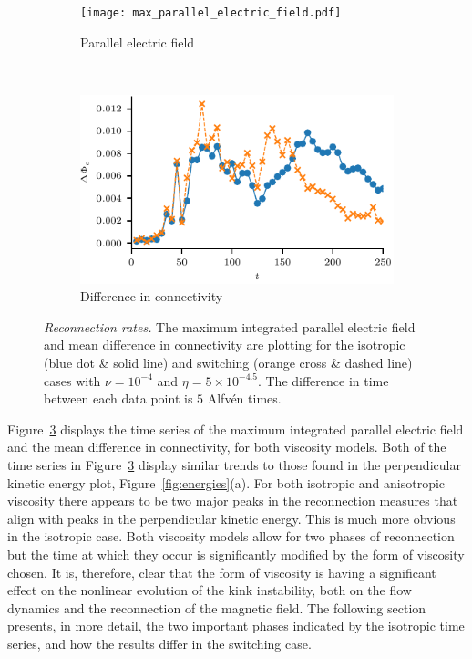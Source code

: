 \begin{figure}[t]
    \centering
    \begin{subfigure}[t]{0.5\textwidth}
      \centering
      \texttt{[image: max\_parallel\_electric\_field.pdf]}
      \caption{Parallel electric field}
      \label{fig:max_parallel_electric_field}
    \end{subfigure}%
    ~
    \begin{subfigure}[t]{0.5\textwidth}
      \centering
      \includegraphics[width=\linewidth]{mean_difference_in_connectivity.pdf}
      \caption{Difference in connectivity}
      \label{fig:mean_difference_in_connectivity}
    \end{subfigure}
    \caption{\textit{Reconnection rates.} The maximum integrated parallel electric field and mean difference in connectivity are plotting for the isotropic (blue dot \& solid line) and switching (orange cross \& dashed line) cases with $\nu = 10^{-4}$ and $\eta = 5\times 10^{-4.5}$. The difference in time between each data point is $5$ Alfv\'en times.}
    \label{fig:reconnection-rates}
\end{figure}

Figure~\ref{fig:reconnection-rates} displays the time series of the maximum integrated parallel electric field and the mean difference in connectivity, for both viscosity models. Both of the time series in Figure~\ref{fig:reconnection-rates} display similar trends to those found in the perpendicular kinetic energy plot, Figure~\ref{fig:energies}(a). For both isotropic and anisotropic viscosity there appears to be two major peaks in the reconnection measures that align with peaks in the perpendicular kinetic energy. This is much more obvious in the isotropic case. Both viscosity models allow for two phases of reconnection but the time at which they occur is significantly modified by the form of viscosity chosen. It is, therefore, clear that the form of viscosity is having a significant effect on the nonlinear evolution of the kink instability, both on the flow dynamics and the reconnection of the magnetic field. The following section presents, in more detail, the two important phases indicated by the isotropic time series, and how the results differ in the switching case.

